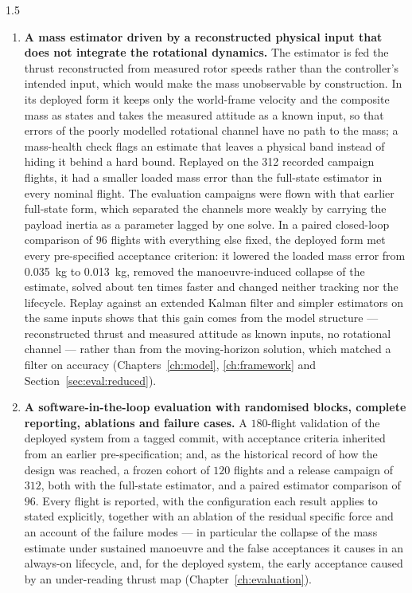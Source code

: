\begin{spacing}{1.5}
\begin{enumerate}
\item \textbf{A mass estimator driven by a reconstructed physical input that
does not integrate the rotational dynamics.} The estimator is fed the thrust
reconstructed from measured rotor speeds rather than the controller's intended
input, which would make the mass unobservable by construction. In its deployed
form it keeps only the world-frame velocity and the composite mass as states and
takes the measured attitude as a known input, so that errors of the poorly
modelled rotational channel have no path to the mass; a mass-health check flags
an estimate that leaves a physical band instead of hiding it behind a hard bound.
Replayed on the 312 recorded campaign flights, it had a smaller loaded mass error
than the full-state estimator in every nominal flight. The evaluation campaigns
were flown with that earlier full-state form, which separated the channels more
weakly by carrying the payload inertia as a parameter lagged by one solve. In a
paired closed-loop comparison of $96$ flights with everything else fixed, the
deployed form met every pre-specified acceptance criterion: it lowered the
loaded mass error from \SI{0.035}{\kg} to \SI{0.013}{\kg}, removed the
manoeuvre-induced collapse of the estimate, solved about ten times faster and
changed neither tracking nor the lifecycle. Replay against an extended Kalman
filter and simpler estimators on the same inputs shows that this gain comes from
the model structure --- reconstructed thrust and measured attitude as known
inputs, no rotational channel --- rather than from the moving-horizon solution,
which matched a filter on accuracy (Chapters~\ref{ch:model},
\ref{ch:framework} and Section~\ref{sec:eval:reduced}).

\item \textbf{A software-in-the-loop evaluation with randomised blocks, complete
reporting, ablations and failure cases.} A $180$-flight validation of the
deployed system from a tagged commit, with acceptance criteria inherited from an
earlier pre-specification; and, as the historical record of how the design was
reached, a frozen cohort of $120$ flights and a release campaign of $312$, both
with the full-state estimator, and a paired estimator comparison of $96$. Every
flight is reported, with the configuration each
result applies to stated explicitly, together with an
ablation of the residual specific force and an account of the failure modes --- in particular the
collapse of the mass estimate under sustained manoeuvre and the false
acceptances it causes in an always-on lifecycle, and, for the deployed system,
the early acceptance caused by an under-reading thrust map
(Chapter~\ref{ch:evaluation}).
\end{enumerate}


\end{spacing}
